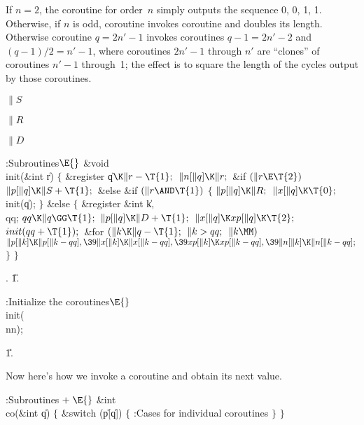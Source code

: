 If $n=2$, the coroutine for order~$n$ simply outputs the sequence 0, 0, 1, 1.
Otherwise, if $n$ is odd, coroutine  invokes coroutine
 and doubles its length.
Otherwise coroutine $q=2n'-1$ invokes coroutines
$q-1=2n'-2$ and $(q-1)/2=n'-1$, where coroutines $2n'-1$ through
$n'$ are ``clones'' of coroutines $n'-1$ through~1; the effect
is to square the length of the cycles output by those coroutines.

\Y\B\4\D$\|S$ \5
\par
\B\4\D$\|R$ \5
\par
\B\4\D$\|D$ \5
\par
\Y\B\4:Subroutines\X${}\E{}$\6
\&{void} \\{init}(\&{int} \|r)\1\1\2\2\6
${}\{{}$\1\6
\&{register} \|q${}\K\|r-\T{1};{}$\7
${}\|n[\|q]\K\|r;{}$\6
\&{if} ${}(\|r\E\T{2}){}$\1\5
${}\|p[\|q]\K\|S+\T{1};{}$\2\6
\&{else} \&{if} ${}(\|r\AND\T{1}){}$\5
${}\{{}$\1\6
${}\|p[\|q]\K\|R;{}$\6
${}\|x[\|q]\K\T{0};{}$\6
\\{init}(\|q);\6
\4${}\}{}$\5
\2\&{else}\5
${}\{{}$\1\6
\&{register} \&{int} \|k${},{}$ \\{qq};\7
${}\\{qq}\K\|q\GG\T{1};{}$\6
${}\|p[\|q]\K\|D+\T{1};{}$\6
${}\|x[\|q]\K\\{xp}[\|q]\K\T{2};{}$\6
${}\\{init}(\\{qq}+\T{1});{}$\6
\&{for} ${}(\|k\K\|q-\T{1};{}$ ${}\|k>\\{qq};{}$ ${}\|k\MM){}$\1\5
${}\|p[\|k]\K\|p[\|k-\\{qq}],\39\|x[\|k]\K\|x[\|k-\\{qq}],\39\\{xp}[\|k]\K%
\\{xp}[\|k-\\{qq}],\39\|n[\|k]\K\|n[\|k-\\{qq}];{}$\2\6
\4${}\}{}$\2\6
\4${}\}{}$\2\par
{}.
\U1.\fi

\B{}:Initialize the coroutines\X${}\E{}$\6
\\{init}(\\{nn});\par
\U1.\fi

Now here's how we invoke a coroutine and obtain its next value.

\Y\B\4:Subroutines\X${}\mathrel+\E{}$\6
\&{int} \\{co}(\&{int} \|q)\1\1\2\2\6
${}\{{}$\1\6
\&{switch} (\|p[\|q])\5
${}\{{}$\1\6
:Cases for individual coroutines\X\6
\4${}\}{}$\2\6
\4${}\}{}$\2\par
\fi

